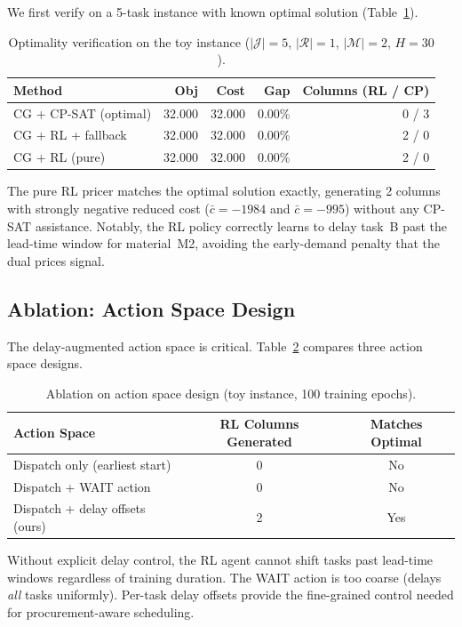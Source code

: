 \documentclass[11pt]{article}
\newcommand{\calJ}{\mathcal{J}}
\newcommand{\calM}{\mathcal{M}}
\newcommand{\calR}{\mathcal{R}}
\begin{document}
We first verify on a 5-task instance with known optimal solution (Table~\ref{tab:toy}).

\begin{table}[h]
\centering
\caption{Optimality verification on the toy instance ($|\calJ|=5$, $|\calR|=1$, $|\calM|=2$, $H=30$).}
\label{tab:toy}
\begin{tabular}{lrrrr}
\toprule
Method & Obj & Cost & Gap & Columns (RL / CP) \\
\midrule
CG + CP-SAT (optimal) & 32.000 & 32.000 & 0.00\% & 0 / 3 \\
CG + RL + fallback     & 32.000 & 32.000 & 0.00\% & 2 / 0 \\
CG + RL (pure)         & 32.000 & 32.000 & 0.00\% & 2 / 0 \\
\bottomrule
\end{tabular}
\end{table}

The pure RL pricer matches the optimal solution exactly, generating 2 columns with strongly negative reduced cost ($\bar{c} = -1984$ and $\bar{c} = -995$) without any CP-SAT assistance.
Notably, the RL policy correctly learns to delay task~B past the lead-time window for material~M2, avoiding the early-demand penalty that the dual prices signal.

\subsection{Ablation: Action Space Design}

The delay-augmented action space is critical.
Table~\ref{tab:ablation} compares three action space designs.

\begin{table}[h]
\centering
\caption{Ablation on action space design (toy instance, 100 training epochs).}
\label{tab:ablation}
\begin{tabular}{lcc}
\toprule
Action Space & RL Columns Generated & Matches Optimal \\
\midrule
Dispatch only (earliest start) & 0 & No \\
Dispatch + WAIT action & 0 & No \\
Dispatch + delay offsets (ours) & 2 & Yes \\
\bottomrule
\end{tabular}
\end{table}

Without explicit delay control, the RL agent cannot shift tasks past lead-time windows regardless of training duration.
The WAIT action is too coarse (delays \emph{all} tasks uniformly).
Per-task delay offsets provide the fine-grained control needed for procurement-aware scheduling.
\end{document}
